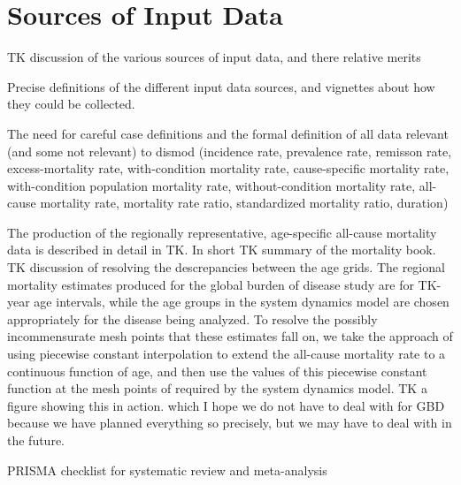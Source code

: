\section{Sources of Input Data}

TK discussion of the various sources of input data, and there relative
merits

 Precise definitions of the different input data sources, and
 vignettes about how they could be collected.

The need for careful case definitions and the formal definition of all
data relevant (and some not relevant) to dismod (incidence rate,
prevalence rate, remisson rate, excess-mortality rate, with-condition
mortality rate, cause-specific mortality rate, with-condition
population mortality rate, without-condition mortality rate, all-cause
mortality rate, mortality rate ratio, standardized mortality ratio,
duration)

The production of the regionally representative, age-specific
all-cause mortality data is described in detail in TK. In short TK
summary of the mortality book. TK discussion of resolving the
descrepancies between the age grids. The regional mortality estimates
produced for the global burden of disease study are for TK-year age
intervals, while the age groups in the system dynamics model are
chosen appropriately for the disease being analyzed. To resolve the
possibly incommensurate mesh points that these estimates fall on, we
take the approach of using piecewise constant interpolation to extend
the all-cause mortality rate to a continuous function of age, and then
use the values of this piecewise constant function at the mesh points
of required by the system dynamics model. TK a figure showing this in
action. which I hope we do not have to deal with for GBD because we
have planned everything so precisely, but we may have to deal with in
the future.


PRISMA checklist for systematic review and meta-analysis
